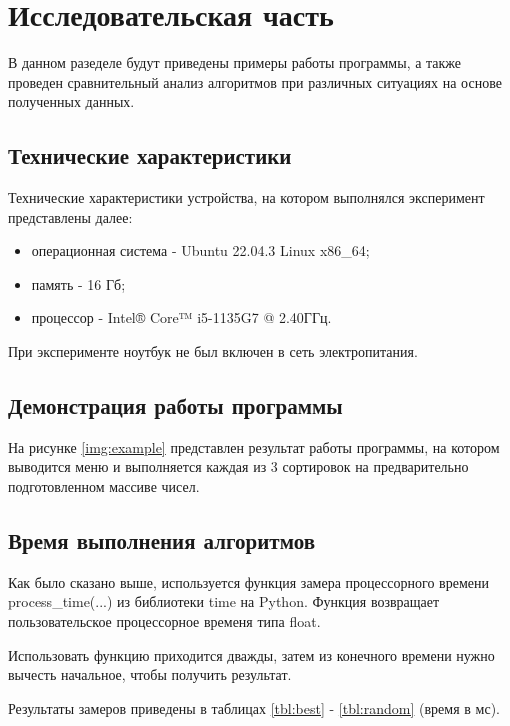 \chapter{Исследовательская часть}

В данном разеделе будут приведены примеры работы программы, а также проведен сравнительный анализ алгоритмов при различных ситуациях на основе полученных данных.

\section{Технические характеристики}

Технические характеристики устройства, на котором выполнялся эксперимент представлены далее:

\begin{itemize}
	\item операционная система - Ubuntu 22.04.3 \cite{ubuntu} Linux \cite{linux} x86\_64;
	\item память - 16 Гб;
	\item процессор - Intel® Core™ i5-1135G7 @ 2.40ГГц.
\end{itemize}

При эксперименте ноутбук не был включен в сеть электропитания.

\section{Демонстрация работы программы}

На рисунке \ref{img:example} представлен результат работы программы, на котором выводится меню и выполняется каждая из 3 сортировок на предварительно подготовленном массиве чисел.

\clearpage

\section{Время выполнения алгоритмов}

Как было сказано выше, используется функция замера процессорного времени process\_time(...) из библиотеки time на Python. Функция возвращает пользовательское процессорное временя типа float.

Использовать функцию приходится дважды, затем из конечного времени нужно вычесть начальное, чтобы получить результат.

Результаты замеров приведены в таблицах \ref{tbl:best} - \ref{tbl:random} (время в мс).

